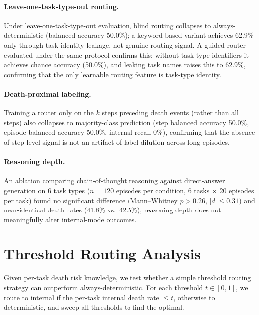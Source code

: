 \documentclass[11pt]{article}
\begin{document}
\paragraph{Leave-one-task-type-out routing.} Under leave-one-task-type-out evaluation, blind routing collapses to always-deterministic (balanced accuracy 50.0\%); a keyword-based variant achieves 62.9\% only through task-identity leakage, not genuine routing signal. A guided router evaluated under the same protocol confirms this: without task-type identifiers it achieves chance accuracy (50.0\%), and leaking task names raises this to 62.9\%, confirming that the only learnable routing feature is task-type identity.

\paragraph{Death-proximal labeling.} Training a router only on the $k$ steps preceding death events (rather than all steps) also collapses to majority-class prediction (step balanced accuracy 50.0\%, episode balanced accuracy 50.0\%, internal recall 0\%), confirming that the absence of step-level signal is not an artifact of label dilution across long episodes.

\paragraph{Reasoning depth.} An ablation comparing chain-of-thought reasoning against direct-answer generation on 6 task types ($n{=}120$ episodes per condition, 6 tasks $\times$ 20 episodes per task) found no significant difference (Mann--Whitney $p > 0.26$, $|d| \leq 0.31$) and near-identical death rates (41.8\% vs.\ 42.5\%); reasoning depth does not meaningfully alter internal-mode outcomes.

\section{Threshold Routing Analysis}
\label{sec:threshold-routing}

Given per-task death risk knowledge, we test whether a simple threshold routing strategy can outperform always-deterministic. For each threshold $t \in [0, 1]$, we route to internal if the per-task internal death rate $\leq t$, otherwise to deterministic, and sweep all thresholds to find the optimal.
\end{document}
